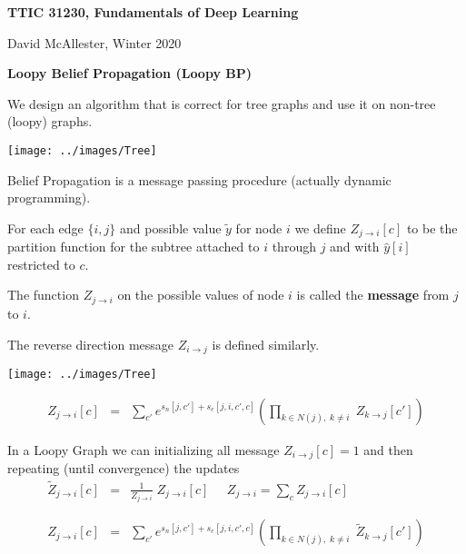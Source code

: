 




{\Huge

  \centerline{\bf TTIC 31230, Fundamentals of Deep Learning}
  \bigskip
  \centerline{David McAllester, Winter 2020}
  \vfill
  \vfill
  \centerline{\bf Loopy Belief Propagation (Loopy BP)}
\vfill
\vfill
\vfill


We design an algorithm that is correct for tree graphs and use it on non-tree (loopy) graphs.


\centerline{\texttt{[image: ../images/Tree]}}

\vfill
Belief Propagation is a message passing procedure (actually dynamic programming).

\vfill
For each edge $\{i,j\}$ and possible value $\tilde{y}$ for node $i$ we define {\color{red} $Z_{j \rightarrow i}[c]$}
to be  the partition function for the subtree attached to $i$ through $j$ and
with $\hat{y}[i]$ restricted to $c$.

\vfill
The function $Z_{j \rightarrow i}$ on the possible values of node $i$ is called the {\bf message} from $j$ to $i$.

\vfill
The reverse direction message $Z_{i \rightarrow j}$ is defined similarly.


\centerline{\texttt{[image: ../images/Tree]}}

\vfill
\begin{eqnarray*}
  Z_{j\rightarrow i}[c] & = & \sum_{c'}  e^{s_n[j,c'] + s_e[j,i,c',c]}
    \left(\prod_{k \in N(j),\;k \not = i}\;Z_{k\rightarrow j}[c']\right)
\end{eqnarray*}


In a Loopy Graph we can initializing all message $Z_{i \rightarrow j}[c] = 1$ and then repeating (until convergence) the updates
\vfill
\begin{eqnarray*}
  \tilde{Z}_{j \rightarrow i}[c] & = & \frac{1}{Z_{j \rightarrow i}}\;Z_{j \rightarrow i}[c] \;\;\;\;\;Z_{j \rightarrow i} = \sum_{c} Z_{j \rightarrow i}[c] \\
  \\
  \\
  Z_{j\rightarrow i}[c] & = & \sum_{c'}  e^{s_n[j,c'] + s_e[j,i,c',c]}
    \left(\prod_{k \in N(j),\;k \not = i}\;\tilde{Z}_{k\rightarrow j}[c']\right)
\end{eqnarray*}

}

